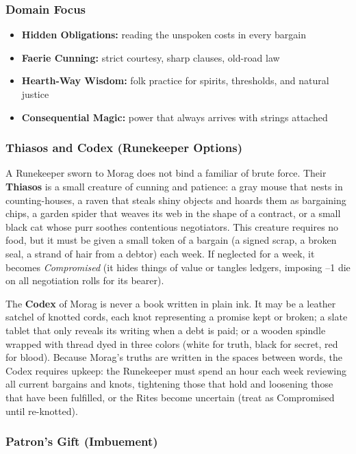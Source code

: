 \subsubsection*{Domain Focus}
\begin{itemize}
  \item \textbf{Hidden Obligations:} reading the unspoken costs in every bargain
  \item \textbf{Faerie Cunning:} strict courtesy, sharp clauses, old-road law
  \item \textbf{Hearth-Way Wisdom:} folk practice for spirits, thresholds, and natural justice
  \item \textbf{Consequential Magic:} power that always arrives with strings attached
\end{itemize}

\subsubsection*{Thiasos and Codex (Runekeeper Options)}

A Runekeeper sworn to Morag does not bind a familiar of brute force. Their \textbf{Thiasos} is a small creature of cunning and patience: a gray mouse that nests in counting-houses, a raven that steals shiny objects and hoards them as bargaining chips, a garden spider that weaves its web in the shape of a contract, or a small black cat whose purr soothes contentious negotiators. This creature requires no food, but it must be given a small token of a bargain (a signed scrap, a broken seal, a strand of hair from a debtor) each week. If neglected for a week, it becomes \textit{Compromised} (it hides things of value or tangles ledgers, imposing --1 die on all negotiation rolls for its bearer).

The \textbf{Codex} of Morag is never a book written in plain ink. It may be a leather satchel of knotted cords, each knot representing a promise kept or broken; a slate tablet that only reveals its writing when a debt is paid; or a wooden spindle wrapped with thread dyed in three colors (white for truth, black for secret, red for blood). Because Morag's truths are written in the spaces between words, the Codex requires upkeep: the Runekeeper must spend an hour each week reviewing all current bargains and knots, tightening those that hold and loosening those that have been fulfilled, or the Rites become uncertain (treat as Compromised until re-knotted).

\subsubsection*{Patron's Gift (Imbuement)}


